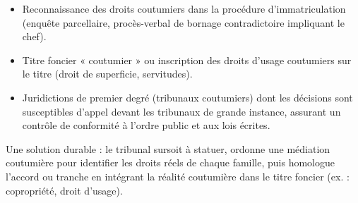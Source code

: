 \documentclass[11pt]{article}
\newcommand{\cle}[1]{{\popxbold\color{popdark}#1}}
\begin{document}
\begin{corrige}
\begin{enumerate}
\begin{itemize}
      \item \cle{Reconnaissance des droits coutumiers} dans la procédure d'immatriculation (enquête parcellaire, procès-verbal de bornage contradictoire impliquant le chef).
      \item \cle{Titre foncier « coutumier »} ou inscription des droits d'usage coutumiers sur le titre (droit de superficie, servitudes).
      \item \cle{Juridictions de premier degré} (tribunaux coutumiers) dont les décisions sont susceptibles d'appel devant les tribunaux de grande instance, assurant un contrôle de conformité à l'ordre public et aux lois écrites.
      \end{itemize}
      Une solution durable : le tribunal sursoit à statuer, ordonne une médiation coutumière pour identifier les droits réels de chaque famille, puis homologue l'accord ou tranche en intégrant la réalité coutumière dans le titre foncier (ex. : copropriété, droit d'usage).
\end{enumerate}
\end{corrige}
\end{document}
